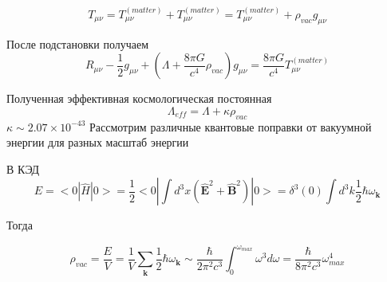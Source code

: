 \documentclass[12pt]{article}
\begin{document}
	\[
	T_{\mu \nu} = T_{\mu \nu}^{(matter)} + T_{\mu \nu}^{(matter)} = T_{\mu \nu}^{(matter)} + \rho_{vac} g_{\mu \nu}
	\]
	
	После подстановки получаем
	\[
	R_{\mu \nu} - \frac{1}{2} g_{\mu \nu} + (\Lambda + \frac{8 \pi G}{c^4} \rho_{vac}) g_{\mu \nu} = \frac{8 \pi G}{c^4} T_{\mu \nu}^{(matter)} 
	\]
	
	Полученная эффективная космологическая постоянная
	\[
	\Lambda_{eff} = \Lambda + \kappa \rho_{vac}
	\]
	$\kappa \sim 2.07 \times 10^{-43}$ 
	Рассмотрим различные квантовые поправки от вакуумной энергии для разных масштаб энергии
	 
	 В КЭД
	 \[
	 E = <0| \hat{H}|0> = \frac{1}{2} <0| \int d^3 x (\hat{\mathbf{E}}^2 + \hat{\mathbf{B}}^2)|0> = \delta^3(0) \int d^3 k \frac{1}{2} \hbar \omega_{\mathbf{k}}
	 \]
	 
	 Тогда 
	 
	 \[
	 \rho_{vac} = \frac{E}{V} = \frac{1}{V} \sum_{\mathbf{k}} \frac{1}{2} \hbar \omega_{\mathbf{k}} \sim \frac{\hbar}{2 \pi^2 c^3} \int_{0}^{\omega_{max}} \omega^3 d\omega = \frac{\hbar}{8 \pi^2 c^3} \omega^4_{max}
	 \]
	 
	 
\end{document}
